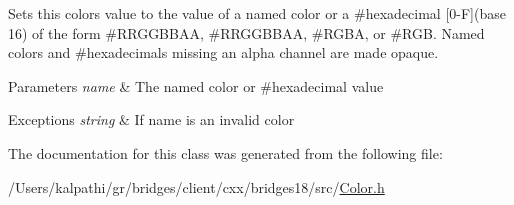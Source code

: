 Sets this color\textquotesingle{}s value to the value of a named color or a \#hexadecimal \mbox{[}0-\/F\mbox{]}(base 16) of the form \#\+R\+R\+G\+G\+B\+B\+AA, \#\+R\+R\+G\+G\+B\+B\+AA, \#\+R\+G\+BA, or \#\+R\+GB. Named colors and \#hexadecimals missing an alpha channel are made opaque.


\begin{DoxyParams}{Parameters}
{\em name} & The named color or \#hexadecimal value \\
\hline
\end{DoxyParams}

\begin{DoxyExceptions}{Exceptions}
{\em string} & If name is an invalid color \\
\hline
\end{DoxyExceptions}


The documentation for this class was generated from the following file\+:\begin{DoxyCompactItemize}
\item 
/\+Users/kalpathi/gr/bridges/client/cxx/bridges18/src/\mbox{\hyperlink{_color_8h}{Color.\+h}}\end{DoxyCompactItemize}
